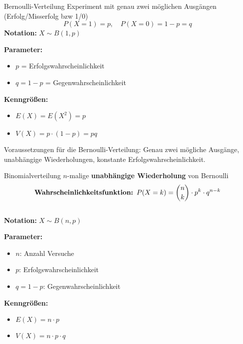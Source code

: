 \begin{definition}{Bernoulli-Verteilung}
Experiment mit genau zwei möglichen Ausgängen (Erfolg/Misserfolg bzw 1/0)
\vspace{-2mm}\\
$$P(X=1) = p, \quad P(X=0) = 1-p = q$$
\textbf{Notation:} $X \sim B(1,p)$

\begin{minipage}[t]{0.5\textwidth}
\textbf{Parameter:}
\begin{itemize}
    \item $p$ = Erfolgswahrscheinlichkeit
    \item $q = 1-p$ = Gegenwahrscheinlichkeit
\end{itemize}
\end{minipage}
\begin{minipage}[t]{0.5\textwidth}
\textbf{Kenngrößen:}
\begin{itemize}
    \item $E(X)=E(X^2)=p$
    \item $V(X)=p \cdot(1-p)=pq$
\end{itemize}
\end{minipage}
\end{definition}

\begin{remark}
Voraussetzungen für die Bernoulli-Verteilung: Genau zwei mögliche Ausgänge, unabhängige Wiederholungen, konstante Erfolgswahrscheinlichkeit.
\end{remark}


\begin{definition}{Binomialverteilung}
$n$-malige \textbf{unabhängige Wiederholung} von Bernoulli
\vspace{-2mm}\\
$$\text{\textbf{Wahrscheinlichkeitsfunktion: }}P(X=k) = \binom{n}{k} \cdot p^k \cdot q^{n-k}$$
\vspace{-4mm}\\
\textbf{Notation:} $X \sim B(n,p)$

\begin{minipage}[t]{0.6\textwidth}
\textbf{Parameter:}
\begin{itemize}
    \item $n$: Anzahl Versuche
    \item $p$: Erfolgswahrscheinlichkeit
    \item $q = 1-p$: Gegenwahrscheinlichkeit
\end{itemize}
\end{minipage}
\begin{minipage}[t]{0.35\textwidth}
\textbf{Kenngrößen:}
\begin{itemize}
    \item $E(X) = n \cdot p$
    \item $V(X) = n \cdot p \cdot q$
\end{itemize}
\end{minipage}
\end{definition}

